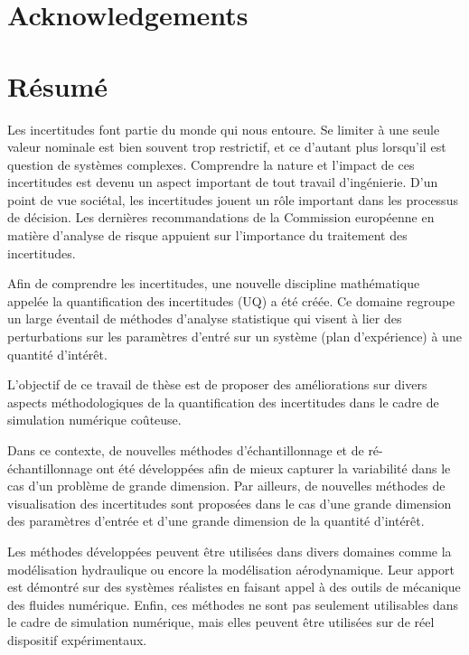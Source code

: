 
\cleardoublepage
\section*{Acknowledgements}


\newpage
{}
\section*{Résumé}

Les incertitudes font partie du monde qui nous entoure. Se limiter à une seule valeur nominale est bien souvent trop restrictif, et ce d'autant plus lorsqu'il est question de systèmes complexes. Comprendre la nature et l'impact de ces incertitudes est devenu un aspect important de tout travail d'ingénierie. D'un point de vue sociétal, les incertitudes jouent un rôle important dans les processus de décision. Les dernières recommandations de la Commission européenne en matière d'analyse de risque appuient sur l'importance du traitement des incertitudes.

Afin de comprendre les incertitudes, une nouvelle discipline mathématique appelée la quantification des incertitudes (UQ) a été créée. Ce domaine regroupe un large éventail de méthodes d'analyse statistique qui visent à lier des perturbations sur les paramètres d'entré sur un système (plan d'expérience) à une quantité d'intérêt.

L'objectif de ce travail de thèse est de proposer des améliorations sur divers aspects méthodologiques de la quantification des incertitudes dans le cadre de simulation numérique coûteuse.

Dans ce contexte, de nouvelles méthodes d'échantillonnage et de ré-échantillonnage ont été développées afin de mieux capturer la variabilité dans le cas d'un problème de grande dimension. Par ailleurs, de nouvelles méthodes de visualisation des incertitudes sont proposées dans le cas d'une grande dimension des paramètres d'entrée et d'une grande dimension de la quantité d'intérêt.

Les méthodes développées peuvent être utilisées dans divers domaines comme la modélisation hydraulique ou encore la modélisation aérodynamique. Leur apport est démontré sur des systèmes réalistes en faisant appel à des outils de mécanique des fluides numérique. Enfin, ces méthodes ne sont pas seulement utilisables dans le cadre de simulation numérique, mais elles peuvent être utilisées sur de réel dispositif expérimentaux.\\

